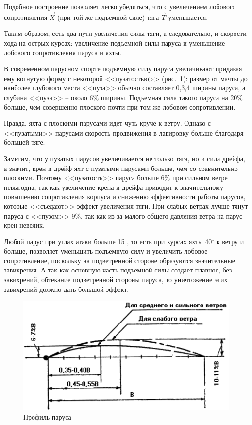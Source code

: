 \documentclass[a4paper, 12pt, twoside, final]{scrbook}
\begin{document}
Подобное построение позволяет легко убедиться, что с увеличением лобового сопротивления $\overrightarrow{X}$ (при той же подъемной силе) тяга $\overrightarrow{T}$ уменьшается.

Таким образом, есть два пути увеличения силы тяги, а следовательно, и скорости хода на острых курсах: увеличение подъемной силы паруса и уменьшение лобового сопротивления паруса и яхты.

В современном парусном спорте подъемную силу паруса увеличивают придавая ему вогнутую форму с некоторой <<пузатостью>> (рис.~\ref{fig:96}): размер от мачты до наиболее глубокого места <<пуза>> обычно составляет 0,3,4 ширины паруса, а глубина <<пуза>> \--- около 6\% ширины. Подъемная сила такого паруса на 20\% больше, чем совершенно плоского почти при том же лобовом сопротивлении.


Правда, яхта с плоскими парусами идет чуть круче к ветру. Однако с <<пузатыми>> парусами скорость продвижения в лавировку больше благодаря большей тяге.

Заметим, что у пузатых парусов увеличивается не только тяга, но и сила дрейфа, а значит, крен и дрейф яхт с пузатыми парусами больше, чем со сравнительно плоскими. Поэтому <<пузатость>> паруса больше 6\% при сильном ветре невыгодна, так как увеличение крена и дрейфа приводит к значительному повышению сопротивления корпуса и снижению эффективности работы парусов, которые <<съедают>> эффект увеличения тяги. При слабых ветрах лучше тянут паруса с <<пузом>> 9\%, так как из-за малого общего давления ветра на парус крен невелик.


Любой парус при углах атаки больше 15$^\circ$, то есть при курсах яхты 40$^\circ$ к ветру и больше, позволяет уменьшить подъемную силу и увеличить лобовое сопротивление, поскольку на подветренной стороне образуются значительные завихрения. А так как основную часть подъемной силы создает плавное, без завихрений, обтекание подветренной стороны паруса, то уничтожение этих завихрений должно дать большой эффект. 


\begin{figure}[htbp]
	\centering
	\includegraphics[scale=1]{96_Profil_parusa}
	\caption{Профиль паруса}
	\label{fig:96}
\end{figure}
\end{document}

